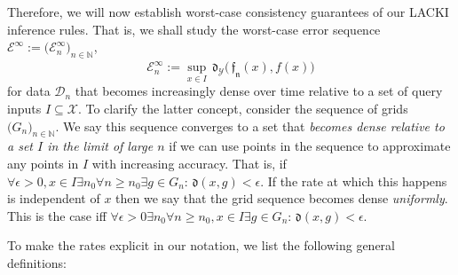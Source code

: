 \documentclass{article} %
\theoremstyle{definition}
\newtheorem{defn}[thm]{Definition}
\theoremstyle{remark}
\newcommand{\Real}{\mathbb R}
\newcommand{\nat}{\mathbb N}
\newcommand{\data}{\ensuremath{ \mathcal D} }
\newcommand{\inspace}{\ensuremath{ \mathcal X}}
\newcommand{\outspace}{\ensuremath{ \mathcal Y}}
\newcommand{\grid}{\ensuremath{  G}}
\newcommand{\metric}{\, \mathfrak{d}} %
\newcommand{\predfn}{\, \mathfrak{  \hat f_n}} %
\newcommand{\seq}[2]{\ensuremath{\bigl(#1\bigr)_{#2}}}
\newcommand{\convto}{\longrightarrow}
\newcommand{\errmetric}{\mathcal E} %
\newcommand{\queryset}{I} %
\begin{document}
Therefore, we will now establish worst-case consistency guarantees of our LACKI inference rules. That is, we shall study the worst-case error  
sequence $\errmetric^\infty :=\seq{\errmetric^\infty_n}{n \in \nat}$, 
\begin{equation}
\errmetric^\infty_n := \sup_{x \in \queryset } \metric_\outspace\bigl(\predfn(x), f(x)\bigr)\end{equation}
for data $\data_n$ that becomes increasingly dense over time relative to a set of query inputs $\queryset \subseteq \inspace$. 
To clarify the latter concept, 
consider the sequence of grids $\seq{\grid_n}{n \in \nat}$. 
We say this sequence converges to a set that \emph{becomes dense relative to a set $I$ in the limit of large $n$ } if we can use points in the sequence to approximate any points in $I$ with increasing accuracy. That is, if $\forall \epsilon >0,x \in I \exists n_0 \forall n \geq n_0 \exists g \in \grid_n: \metric(x,g) < \epsilon$. If the rate at which this happens is independent of $x$ then we say that the grid sequence becomes dense \emph{uniformly}. This is the case iff $\forall \epsilon >0 \exists n_0 \forall n \geq n_0, x \in I \exists g \in \grid_n: \metric(x,g) < \epsilon$.

To make the rates explicit in our notation, we list the following general definitions: 

\end{document}
